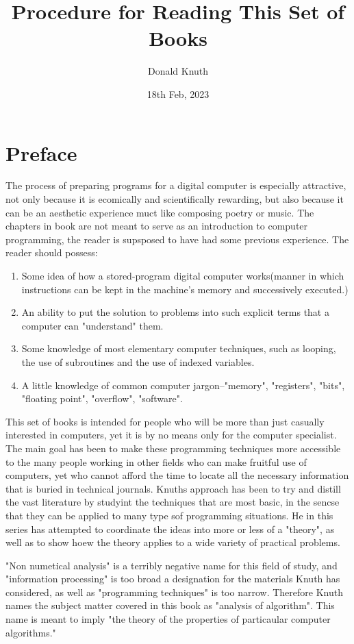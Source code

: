 \documentclass{article}
\title{Procedure for Reading This Set of Books}
\author{Donald Knuth}
\date{18th Feb, 2023}
\begin{document}
\maketitle
\newpage

\tableofcontents
\newpage

\section{Preface}
The process of preparing programs for a digital computer is especially attractive, not only because it is ecomically and scientifically rewarding, but also because it can be an aesthetic experience muct like composing poetry or music. The chapters in book are not meant to serve as an introduction to computer programming, the reader is supsposed to have had some previous experience. The reader should possess:
\begin{enumerate}
    \item Some idea of how a stored-program digital computer works(manner in which instructions can be kept in the machine's memory and successively executed.)
    \item An ability to put the solution to problems into such explicit terms that a computer can "understand" them.
    \item Some knowledge of most elementary computer techniques, such as looping, the use of subroutines and the use of indexed variables.
    \item A little knowledge of common computer jargon--"memory", "registers", "bits", "floating point", "overflow", "software".
\end{enumerate}

This set of books is intended for people who will be more than just casually interested in computers, yet it is by no means only for the computer specialist. The main goal has been to make these programming techniques more accessible to the many people working in other fields who can make fruitful use of computers, yet who cannot afford the time to locate all the necessary information that is buried in technical journals. Knuths approach has been to try and distill the vast literature by studyint the techniques that are most basic, in the sencse that they can be applied to many type sof programming situations. He in this series has attempted to coordinate the ideas into more or less of a "theory", as well as to show hoew the theory applies to a wide variety of practical problems.

"Non numetical analysis" is a terribly negative name for this field of study, and "information processing" is too broad a designation for the materials Knuth has considered, as well as "programming techniques" is too narrow. Therefore Knuth names the subject matter covered in this book as "analysis of algorithm".  This name is meant to imply "the theory of the properties of particaular computer algorithms."
\newpage
\end{document}
